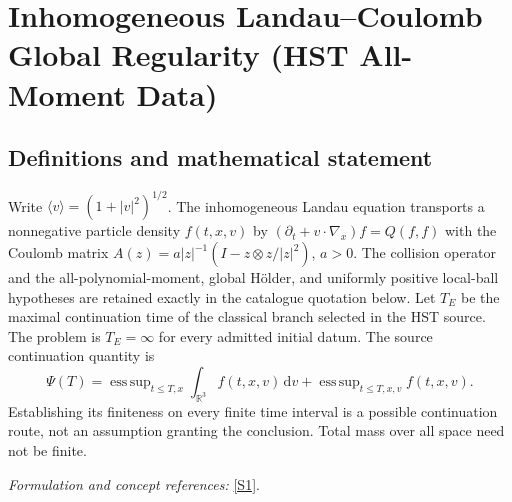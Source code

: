 \documentclass[11pt,a4paper]{article}
\newcommand{\R}{\mathbb{R}}
\newcommand{\dd}{\,\mathrm d}
\newcommand{\sref}[2]{\hyperlink{source:#1:#2}{[S#2]}}
\numberwithin{equation}{section}
\begin{document}
\setcounter{section}{0}
\clearpage
\section*{\texorpdfstring{Inhomogeneous Landau–Coulomb Global Regularity (HST All-Moment Data)}{Inhomogeneous Landau–Coulomb Global Regularity (HST All-Moment Data)}}\label{30006773}
\subsection{Definitions and mathematical statement}
Write $\langle v\rangle=(1+|v|^2)^{1/2}$. The inhomogeneous Landau equation transports a nonnegative particle density $f(t,x,v)$ by
$(\partial_t+v\cdot\nabla_x)f=Q(f,f)$ with the Coulomb matrix
$A(z)=a|z|^{-1}(I-z\otimes z/|z|^2)$, $a>0$. The collision operator and the all-polynomial-moment, global H\"older, and uniformly positive local-ball hypotheses are retained exactly in the catalogue quotation below. Let $T_E$ be the maximal continuation time of the classical branch selected in the HST source. The problem is $T_E=\infty$ for every admitted initial datum. The source continuation quantity is
\[
 \Psi(T)=\mathop{\mathrm{ess\,sup}}_{t\le T,x}\int_{\R^3}f(t,x,v)\dd v
 +\mathop{\mathrm{ess\,sup}}_{t\le T,x,v}f(t,x,v).
\]
Establishing its finiteness on every finite time interval is a possible continuation route, not an assumption granting the conclusion. Total mass over all space need not be finite.
\par\smallskip\textit{Formulation and concept references:} \sref{30006773}{1}.
\end{document}
